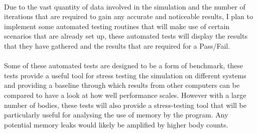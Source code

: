 \paragraph{}
Due to the vast quantity of data involved in the simulation and the number of iterations that are required to gain any accurate and noticeable results, I plan to implement some automated testing routines that will make use of certain scenarios that are already set up, these automated tests will display the results that they have gathered and the results that are required for a Pass/Fail.

\paragraph{}
Some of these automated tests are designed to be a form of benchmark, these tests provide a useful tool for stress testing the simulation on different systems and providing a baseline through which results from other computers can be compared to have a look at how well performance scales. However with a large number of bodies, these tests will also provide a stress-testing tool that will be particularly useful for analysing the use of memory by the program. Any potential memory leaks would likely be amplified by higher body counts.

\paragraph{}